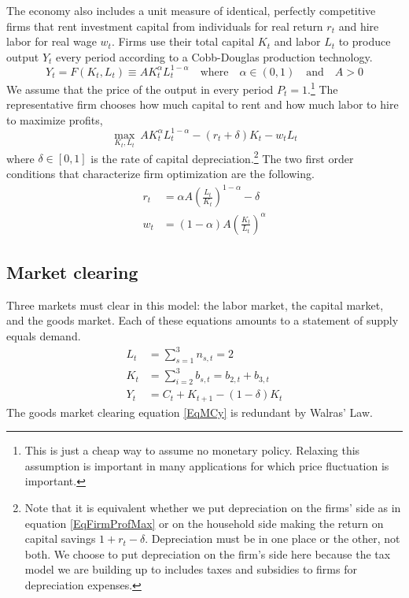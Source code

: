 \documentclass[letterpaper,12pt]{article}
\theoremstyle{definition}
\numberwithin{equation}{section}
\numberwithin{exercise}{section}
\begin{document}
\begin{spacing}{1.5}
      The economy also includes a unit measure of identical, perfectly competitive firms that rent investment capital from individuals for real return $r_t$ and hire labor for real wage $w_t$. Firms use their total capital $K_t$ and labor $L_t$ to produce output $Y_t$ every period according to a Cobb-Douglas production technology.
      \begin{equation}\label{EqFirmProdFunc}
         Y_t = F(K_t,L_t) \equiv AK_t^\alpha L_t^{1-\alpha}\quad\text{where}\quad \alpha\in(0,1) \quad\text{and}\quad A>0
      \end{equation}
      We assume that the price of the output in every period $P_t=1$.\footnote{This is just a cheap way to assume no monetary policy. Relaxing this assumption is important in many applications for which price fluctuation is important.} The representative firm chooses how much capital to rent and how much labor to hire to maximize profits,
      \begin{equation}\label{EqFirmProfMax}
         \max_{K_t,L_t}\: AK_t^\alpha L_t^{1-\alpha} - (r_t + \delta)K_t - w_t L_t
      \end{equation}
      where $\delta\in[0,1]$ is the rate of capital depreciation.\footnote{Note that it is equivalent whether we put depreciation on the firms' side as in equation \eqref{EqFirmProfMax} or on the household side making the return on capital savings $1+r_t-\delta$. Depreciation must be in one place or the other, not both. We choose to put depreciation on the firm's side here because the tax model we are building up to includes taxes and subsidies to firms for depreciation expenses.} The two first order conditions that characterize firm optimization are the following.
      \begin{align}
         r_t &= \alpha A\left(\frac{L_t}{K_t}\right)^{1-\alpha} - \delta \label{EqFirmFOCK} \\
         w_t &= (1-\alpha)A\left(\frac{K_t}{L_t}\right)^\alpha \label{EqFirmFOCL}
      \end{align}


   \subsection{Market clearing}\label{Sec3perSimpMC}

      Three markets must clear in this model: the labor market, the capital market, and the goods market. Each of these equations amounts to a statement of supply equals demand.
      \begin{align}
         L_t &= \sum_{s=1}^3 n_{s,t} = 2 \label{EqMCn} \\
         K_t &= \sum_{i=2}^3 b_{s,t} = b_{2,t} + b_{3,t} \label{EqMCk} \\
         Y_t &= C_t + K_{t+1} - (1-\delta)K_t \label{EqMCy}
      \end{align}
      The goods market clearing equation \eqref{EqMCy} is redundant by Walras' Law.



\end{spacing}
\end{document}
